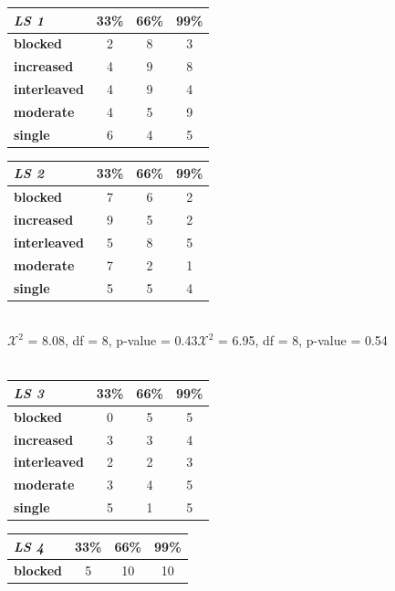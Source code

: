 \documentclass{edm_template}
\begin{document}
\begin{table}[htbp]
 \begin{center}
\begin{tabular}{|l || c | c | c |}
\hline
\emph{LS 1}&33\%&66\%&99\%\\ \hline \hline
  \textbf{blocked}&      2&  8& 3\\ \hline
\textbf{increased}&    4&  9&  8 \\ \hline
  \textbf{interleaved}&  4&  9&  4 \\ \hline
     \textbf{moderate}&     4&  5& 9 \\ \hline
       \textbf{single}&       6&  4&  5 \\ \hline
 \end{tabular}
\label{default}
\begin{tabular}{|l || c | c | c |}
\hline
\emph{LS 2}&33\%&66\%&99\%\\ \hline \hline
  \textbf{blocked}&      7&  6& 2 \\ \hline
\textbf{increased}&    9&  5&  2 \\ \hline
  \textbf{interleaved}&  5&  8&  5 \\ \hline
     \textbf{moderate}&     7&  2& 1 \\ \hline
       \textbf{single}&       5&  5&  4 \\ \hline
 \end{tabular}
\\$\mathcal{X}^2$ = 8.08, df = 8, p-value = 0.43\hspace{15pt}$\mathcal{X}^2$ = 6.95, df = 8, p-value = 0.54\\ \hspace{0pt} \\
\label{default}
\begin{tabular}{|l || c | c | c |}
\hline
\emph{LS 3}&33\%&66\%&99\%\\ \hline \hline
  \textbf{blocked}&      0&  5& 5 \\ \hline
\textbf{increased}&    3&  3&  4 \\ \hline
  \textbf{interleaved}&  2&  2&  3 \\ \hline
     \textbf{moderate}&     3&  4& 5 \\ \hline
       \textbf{single}&       5& 1&  5 \\ \hline
 \end{tabular}
\begin{tabular}{|l || c | c | c |}
\hline
\emph{LS 4}&33\%&66\%&99\%\\ \hline \hline
  \textbf{blocked}&      5&  10& 10 \\ \hline

\end{tabular}
\end{center}
\end{table}
\end{document}
